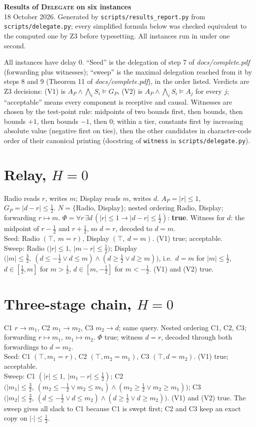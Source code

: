 \documentclass[10pt]{article}\usepackage[margin=0.7in]{geometry}\usepackage{amsmath,amssymb,booktabs,array}
\begin{document}
\begin{center}\textbf{Results of \textsc{Delegate} on six instances}\\ 18 October 2026. Generated by \texttt{scripts/results\_report.py} from \texttt{scripts/delegate.py}; every simplified formula below was checked equivalent to the computed one by Z3 before typesetting. All instances run in under one second.\end{center}
All instances have delay $0$. ``Seed'' is the delegation of step 7 of \emph{docs/complete.pdf} (forwarding plus witnesses); ``sweep'' is the maximal delegation reached from it by steps 8 and 9 (Theorem 11 of \emph{docs/complete.pdf}), in the order listed. Verdicts are Z3 decisions: (V1) is $A_P\wedge\bigwedge_iS_i\models G_P$, (V2) is $A_P\wedge\bigwedge_iS_i\models A_j$ for every $j$; ``acceptable'' means every component is receptive and causal. Witnesses are chosen by the test-point rule: midpoints of two bounds first, then bounds, then bounds $+1$, then bounds $-1$, then $0$; within a tier, constants first by increasing absolute value (negative first on ties), then the other candidates in character-code order of their canonical printing (docstring of \texttt{witness} in \texttt{scripts/delegate.py}).
\section{Relay, $H=0$}
Radio reads $r$, writes $m$; Display reads $m$, writes $d$. $A_P=|r|\le1$, $G_P=|d-r|\le\tfrac12$. $N=\{$Radio, Display$\}$; nested ordering Radio, Display; forwarding $r\mapsto m$. $\Phi=\forall r\,\exists d\,(|r|\le1\to|d-r|\le\tfrac12)$: \textbf{true}. Witness for $d$: the midpoint of $r-\tfrac12$ and $r+\tfrac12$, so $d=r$, decoded to $d=m$.\\
Seed: Radio $(\top,\ m=r)$, Display $(\top,\ d=m)$. (V1) true; acceptable.\\
Sweep: Radio $\big(|r|\le1,\ |m-r|\le\tfrac12\big)$; Display $\big(|m|\le\tfrac32,\ (d\le-\tfrac12\vee d\le m)\wedge(d\ge\tfrac12\vee d\ge m)\big)$, i.e.\ $d=m$ for $|m|\le\tfrac12$, $d\in[\tfrac12,m]$ for $m>\tfrac12$, $d\in[m,-\tfrac12]$ for $m<-\tfrac12$. (V1) and (V2) true.
\section{Three-stage chain, $H=0$}
C1 $r\to m_1$, C2 $m_1\to m_2$, C3 $m_2\to d$; same query. Nested ordering C1, C2, C3; forwarding $r\mapsto m_1$, $m_1\mapsto m_2$. $\Phi$ true; witness $d=r$, decoded through both forwardings to $d=m_2$.\\
Seed: C1 $(\top,m_1=r)$, C2 $(\top,m_2=m_1)$, C3 $(\top,d=m_2)$. (V1) true; acceptable.\\
Sweep: C1 $(|r|\le1,\ |m_1-r|\le\tfrac12)$; C2 $\big(|m_1|\le\tfrac32,\ (m_2\le-\tfrac12\vee m_2\le m_1)\wedge(m_2\ge\tfrac12\vee m_2\ge m_1)\big)$; C3 $\big(|m_2|\le\tfrac32,\ (d\le-\tfrac12\vee d\le m_2)\wedge(d\ge\tfrac12\vee d\ge m_2)\big)$. (V1) and (V2) true. The sweep gives all slack to C1 because C1 is swept first; C2 and C3 keep an exact copy on $|\cdot|\le\tfrac12$.
\end{document}
